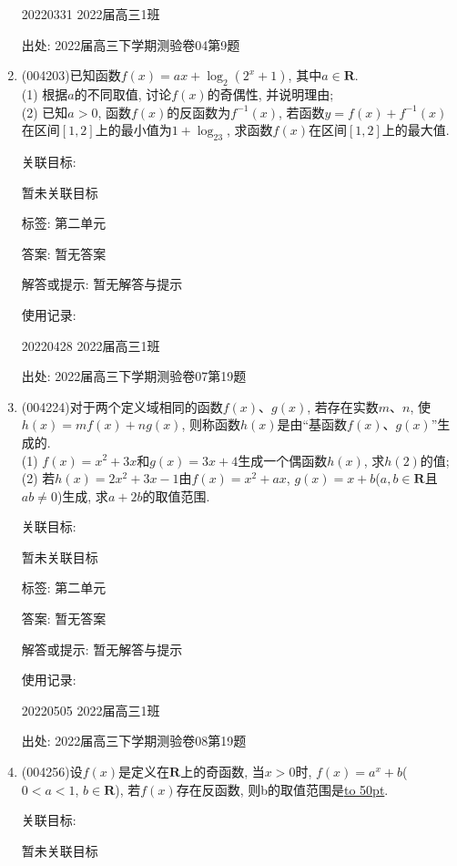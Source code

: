 \documentclass[10pt,a4paper]{article}
\newcommand{\blank}[1]{\underline{\hbox to #1pt{}}}
\begin{document}
\begin{enumerate}[1.]
20220331	2022届高三1班	


出处: 2022届高三下学期测验卷04第9题
\item { (004203)}已知函数$f(x)=ax+\log_2(2^x+1)$, 其中$a\in \mathbf{R}$.\\
(1) 根据$a$的不同取值, 讨论$f(x)$的奇偶性, 并说明理由;\\
(2) 已知$a>0$, 函数$f(x)$的反函数为$f^{-1}(x)$, 若函数$y=f(x)+f^{-1}(x)$在区间$[1,2]$上的最小值为$1+\log_23$, 求函数$f(x)$在区间$[1,2]$上的最大值.


关联目标:

暂未关联目标



标签: 第二单元

答案: 暂无答案

解答或提示: 暂无解答与提示

使用记录:

20220428	2022届高三1班		


出处: 2022届高三下学期测验卷07第19题
\item { (004224)}对于两个定义域相同的函数$f(x)$、$g(x)$, 若存在实数$m$、$n$, 使$h(x)=mf(x)+ng(x)$, 则称函数$h(x)$是由``基函数$f(x)$、$g(x)$''生成的.\\
(1) $f(x)=x^2+3x$和$g(x)=3x+4$生成一个偶函数$h(x)$, 求$h(2)$的值;\\
(2) 若$h(x)=2x^2+3x-1$由$f(x)=x^2+ax$, $g(x)=x+b$($a,b\in \mathbf{R}$且$ab\ne 0$)生成, 求$a+2b$的取值范围.


关联目标:

暂未关联目标



标签: 第二单元

答案: 暂无答案

解答或提示: 暂无解答与提示

使用记录:

20220505	2022届高三1班		


出处: 2022届高三下学期测验卷08第19题
\item { (004256)}设$f(x)$是定义在$\mathbf{R}$上的奇函数, 当$x>0$时, $f(x)=a^x+b$($0<a<1$, $b\in \mathbf{R}$), 若$f(x)$存在反函数, 则b的取值范围是\blank{50}.


关联目标:

暂未关联目标




\end{enumerate}
\end{document}
